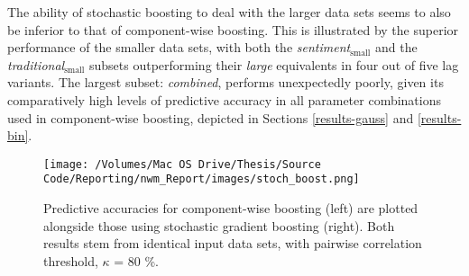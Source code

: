 \documentclass{article}
\begin{document}
The ability of stochastic boosting to deal with the larger data sets seems to also be inferior to that of component-wise boosting. This is illustrated by the superior performance of the smaller data sets, with both the \emph{sentiment$_{\text{small}}$} and the \emph{traditional$_{\text{small}}$} subsets outperforming their \emph{large} equivalents in four out of five lag variants. The largest subset: \emph{combined}, performs unexpectedly poorly, given its comparatively high levels of predictive accuracy in all parameter combinations used in component-wise boosting, depicted in Sections \ref{results-gauss} and \ref{results-bin}.

\begin{figure}[htb]
\centering
\texttt{[image: /Volumes/Mac OS Drive/Thesis/Source Code/Reporting/nwm\_Report/images/stoch\_boost.png]}
\caption[The predictive accuracies of \emph{component-wise} versus \emph{batch} stochastic gradient boosting]{\label{fig:stoch-pred-acc}Predictive accuracies for component-wise boosting (left) are plotted alongside those using stochastic gradient boosting (right). Both results stem from identical input data sets, with pairwise correlation threshold, $\kappa$ = 80 \%.}
\end{figure}


\pagebreak

\vfill
\newpage
\end{document}
